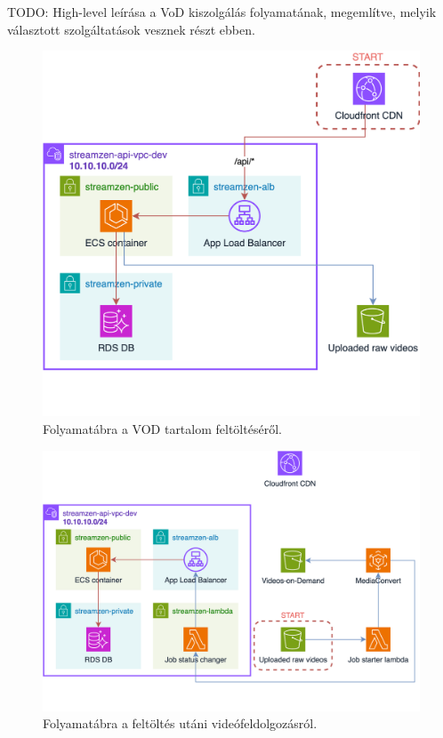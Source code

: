 TODO: High-level leírása a VoD kiszolgálás folyamatának, megemlítve, melyik választott szolgáltatások vesznek részt ebben.

\begin{figure}[ht]
	\centering
	\includegraphics[width=120mm, keepaspectratio]{figures/dipterv_vod1.png}
	\caption{Folyamatábra a VOD tartalom feltöltéséről.}
	\label{fig:vod1}
\end{figure}

\begin{figure}[ht]
	\centering
	\includegraphics[width=120mm, keepaspectratio]{figures/dipterv_vod2.png}
	\caption{Folyamatábra a feltöltés utáni videófeldolgozásról.}
	\label{fig:vod2}
\end{figure}

